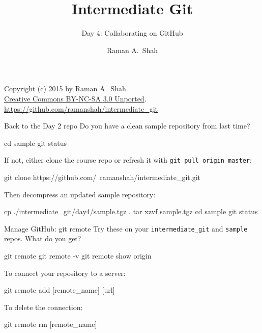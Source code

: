 

\title{Intermediate Git}
\subtitle{Day 4: Collaborating on GitHub}
\author{Raman A.~Shah}
\date{}



\begin{frame}[plain]
  \titlepage
  \footnotesize{Copyright (c) 2015 by Raman A.~Shah.\\
  \href{https://creativecommons.org/licenses/by-nc-sa/3.0/legalcode}
       {Creative Commons BY-NC-SA 3.0 Unported}.\\
   \href{https://github.com/ramanshah/intermediate\_git}
        {https://github.com/ramanshah/intermediate\_git}}
\end{frame}

\begin{frame}[fragile]{Back to the Day 2 repo}
  Do you have a clean sample repository from last time?

  \begin{gitCommand}
cd sample
git status
  \end{gitCommand}

  If not, either clone the course repo or refresh it with
  \texttt{git pull origin master}:

  \begin{gitCommand}
git clone https://github.com/\
ramanshah/intermediate_git.git
  \end{gitCommand}

  Then decompress an updated sample repository:

  \begin{gitCommand}
cp ./intermediate_git/day4/sample.tgz .
tar xzvf sample.tgz
cd sample
git status
  \end{gitCommand}
\end{frame}

\begin{frame}[fragile]{Manage GitHub: git remote}
  Try these on your \texttt{intermediate\_git} and \texttt{sample} repos.
  What do you get?

  \begin{gitCommand}
git remote
git remote -v
git remote show origin
  \end{gitCommand}

  To connect your repository to a server:

  \begin{gitCommand}git remote add [remote_name] [url]\end{gitCommand}

  To delete the connection:

  \begin{gitCommand}git remote rm [remote_name]\end{gitCommand}
\end{frame}

